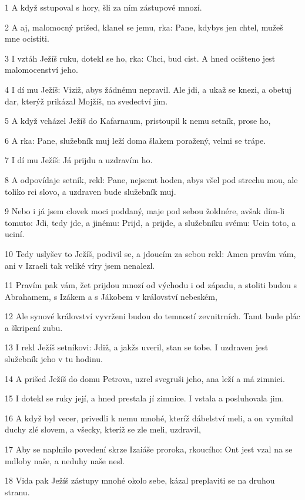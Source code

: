 \par 1 A když sstupoval s hory, šli za ním zástupové mnozí.
\par 2 A aj, malomocný prišed, klanel se jemu, rka: Pane, kdybys jen chtel, mužeš mne ocistiti.
\par 3 I vztáh Ježíš ruku, dotekl se ho, rka: Chci, bud cist. A hned ocišteno jest malomocenství jeho.
\par 4 I dí mu Ježíš: Viziž, abys žádnému nepravil. Ale jdi, a ukaž se knezi, a obetuj dar, kterýž prikázal Mojžíš, na svedectví jim.
\par 5 A když vcházel Ježíš do Kafarnaum, pristoupil k nemu setník, prose ho,
\par 6 A rka: Pane, služebník muj leží doma šlakem poražený, velmi se trápe.
\par 7 I dí mu Ježíš: Já prijdu a uzdravím ho.
\par 8 A odpovídaje setník, rekl: Pane, nejsemt hoden, abys všel pod strechu mou, ale toliko rci slovo, a uzdraven bude služebník muj.
\par 9 Nebo i já jsem clovek moci poddaný, maje pod sebou žoldnére, avšak dím-li tomuto: Jdi, tedy jde, a jinému: Prijd, a prijde, a služebníku svému: Ucin toto, a uciní.
\par 10 Tedy uslyšev to Ježíš, podivil se, a jdoucím za sebou rekl: Amen pravím vám, ani v Izraeli tak veliké víry jsem nenalezl.
\par 11 Pravím pak vám, žet prijdou mnozí od východu i od západu, a stoliti budou s Abrahamem, s Izákem a s Jákobem v království nebeském,
\par 12 Ale synové království vyvrženi budou do temností zevnitrních. Tamt bude plác a škripení zubu.
\par 13 I rekl Ježíš setníkovi: Jdiž, a jakžs uveril, stan se tobe. I uzdraven jest služebník jeho v tu hodinu.
\par 14 A prišed Ježíš do domu Petrova, uzrel svegruši jeho, ana leží a má zimnici.
\par 15 I dotekl se ruky její, a hned prestala jí zimnice. I vstala a posluhovala jim.
\par 16 A když byl vecer, privedli k nemu mnohé, kteríž dábelství meli, a on vymítal duchy zlé slovem, a všecky, kteríž se zle meli, uzdravil,
\par 17 Aby se naplnilo povedení skrze Izaiáše proroka, rkoucího: Ont jest vzal na se mdloby naše, a neduhy naše nesl.
\par 18 Vida pak Ježíš zástupy mnohé okolo sebe, kázal preplaviti se na druhou stranu.
